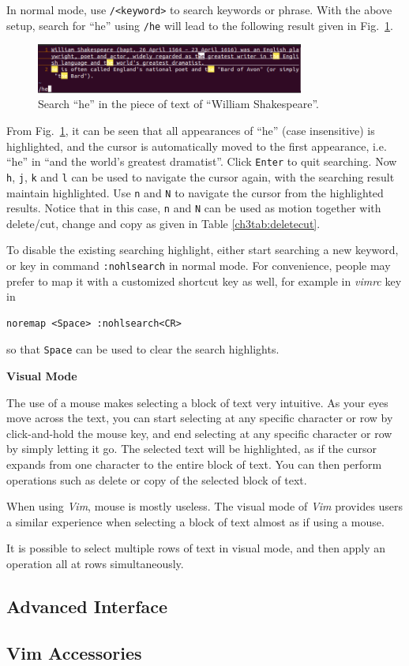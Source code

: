 In normal mode, use \verb|/<keyword>| to search keywords or phrase. With the above setup, search for ``he'' using \verb|/he| will lead to the following result given in Fig.~\ref{ch3fig:vimdemo2}.
\begin{figure}
\centering
\includegraphics[width=250pt]{chapters/chapter3/figures/vimdemo2.png}
\caption{Search ``he'' in the piece of text of ``William Shakespeare''.} \label{ch3fig:vimdemo2}
\end{figure}
From Fig.~\ref{ch3fig:vimdemo2}, it can be seen that all appearances of ``he'' (case insensitive) is highlighted, and the cursor is automatically moved to the first appearance, i.e. ``he'' in ``and the world's greatest dramatist''. Click \verb|Enter| to quit searching. Now \verb|h|, \verb|j|, \verb|k| and \verb|l| can be used to navigate the cursor again, with the searching result maintain highlighted. Use \verb|n| and \verb|N| to navigate the cursor from the highlighted results. Notice that in this case, \verb|n| and \verb|N| can be used as motion together with delete/cut, change and copy as given in Table \ref{ch3tab:deletecut}.

To disable the existing searching highlight, either start searching a new keyword, or key in command \verb|:nohlsearch| in normal mode. For convenience, people may prefer to map it with a customized shortcut key as well, for example in \textit{vimrc} key in
\begin{verbatim}
noremap <Space> :nohlsearch<CR>
\end{verbatim}
so that \verb|Space| can be used to clear the search highlights.

\vspace{0.1in}
\noindent \textbf{Visual Mode}
\vspace{0.1in}

The use of a mouse makes selecting a block of text very intuitive. As your eyes move across the text, you can start selecting at any specific character or row by click-and-hold the mouse key, and end selecting at any specific character or row by simply letting it go. The selected text will be highlighted, as if the cursor expands from one character to the entire block of text. You can then perform operations such as delete or copy of the selected block of text.

When using \textit{Vim}, mouse is mostly useless. The visual mode of \textit{Vim} provides users a similar experience when selecting a block of text almost as if using a mouse.

It is possible to select multiple rows of text in visual mode, and then apply an operation all at rows simultaneously. 



\subsection{Advanced Interface}


\subsection{Vim Accessories}




